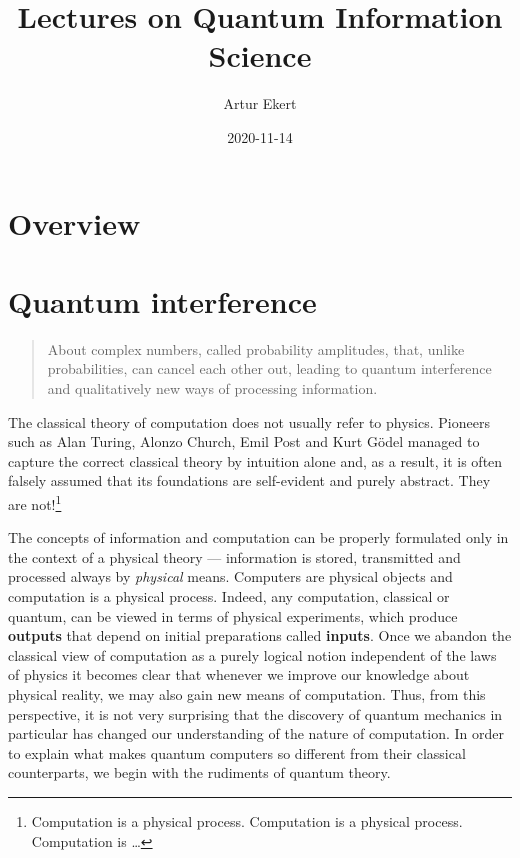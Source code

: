 \documentclass[
]{book}
\title{Lectures on Quantum Information Science}
\author{Artur Ekert}
\date{2020-11-14}
\theoremstyle{definition}
\theoremstyle{definition}
\theoremstyle{definition}
\theoremstyle{remark}
\begin{document}
\maketitle

{
\setcounter{tocdepth}{1}
\tableofcontents
}
\hypertarget{overview}{%
\chapter*{Overview}\label{overview}}

\hypertarget{quantum-interference}{%
\chapter{Quantum interference}\label{quantum-interference}}

\begin{quote}
About complex numbers, called probability amplitudes, that, unlike probabilities, can cancel each other out, leading to quantum interference and qualitatively new ways of processing information.
\end{quote}

The classical theory of computation does not usually refer to physics.
Pioneers such as Alan Turing, Alonzo Church, Emil Post and Kurt Gödel managed to capture the correct classical theory by intuition alone and, as a result, it is often falsely assumed that its foundations are self-evident and purely abstract.
They are not!\footnote{Computation is a physical process. Computation is a physical process. Computation is \ldots{}}

The concepts of information and computation can be properly formulated only in the context of a physical theory --- information is stored, transmitted and processed always by \emph{physical} means.
Computers are physical objects and computation is a physical process.
Indeed, any computation, classical or quantum, can be viewed in terms of physical experiments, which produce \textbf{outputs} that depend on initial preparations called \textbf{inputs}.
Once we abandon the classical view of computation as a purely logical notion independent of the laws of physics it becomes clear that whenever we improve our knowledge about physical reality, we may also gain new means of computation.
Thus, from this perspective, it is not very surprising that the discovery of quantum mechanics in particular has changed our understanding of the nature of computation.
In order to explain what makes quantum computers so different from their classical counterparts, we begin with the rudiments of quantum theory.
\end{document}

